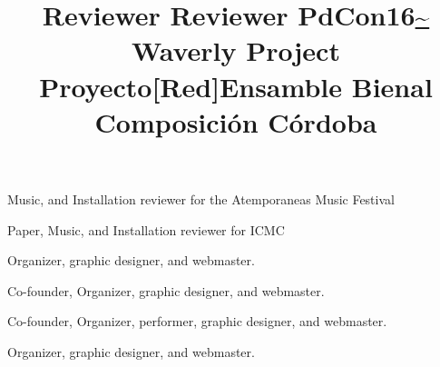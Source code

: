 \title{ Reviewer }
\begin{position} 
Music, and Installation reviewer for the Atemporaneas Music Festival
\end{position}


\title{ Reviewer }
\begin{position} 
Paper, Music, and Installation reviewer for ICMC
\end{position}

\title{ PdCon16\url{~} }
\begin{position} 
Organizer, graphic designer, and webmaster.
\end{position}

\title{ Waverly Project }
\begin{position}
Co-founder, Organizer, graphic designer, and webmaster.
\end{position}

\title{ Proyecto[Red]Ensamble }
\begin{position} 
Co-founder, Organizer, performer, graphic designer, and webmaster.
\end{position}

\title{ Bienal Composición Córdoba }
\begin{position} 
Organizer, graphic designer, and webmaster.
\end{position}